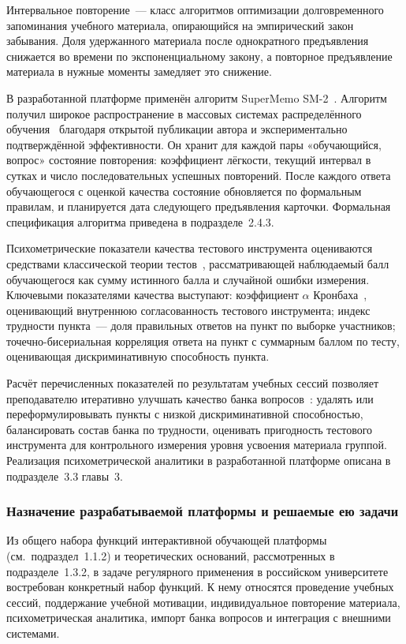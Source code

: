 Интервальное повторение~--- класс алгоритмов оптимизации
долговременного запоминания учебного материала, опирающийся
на эмпирический закон забывания. Доля удержанного материала после
однократного предъявления снижается во времени по экспоненциальному
закону, а повторное предъявление материала в нужные моменты
замедляет это снижение.

В разработанной платформе применён алгоритм SuperMemo
SM-2~\cite{wozniak1990}. Алгоритм получил широкое распространение
в массовых системах распределённого обучения~\cite{alyshova2022}
благодаря открытой публикации автора и экспериментально
подтверждённой эффективности. Он хранит для каждой пары
«обучающийся, вопрос» состояние повторения: коэффициент лёгкости,
текущий интервал в сутках и число последовательных успешных
повторений. После каждого ответа обучающегося с оценкой качества
состояние обновляется по формальным правилам, и планируется дата
следующего предъявления карточки. Формальная спецификация алгоритма
приведена в подразделе~2.4.3.

Психометрические показатели качества тестового инструмента
оцениваются средствами классической теории
тестов~\cite{crocker_algina}, рассматривающей наблюдаемый балл
обучающегося как сумму истинного балла и случайной ошибки
измерения. Ключевыми показателями качества выступают: коэффициент
$\alpha$ Кронбаха~\cite{cronbach1951}, оценивающий внутреннюю
согласованность тестового инструмента; индекс трудности пункта~---
доля правильных ответов на пункт по выборке участников;
точечно-бисериальная корреляция ответа на пункт с суммарным
баллом по тесту, оценивающая дискриминативную способность пункта.

Расчёт перечисленных показателей по результатам учебных сессий
позволяет преподавателю итеративно улучшать качество банка
вопросов~\cite{peryazeva2019}: удалять или переформулировывать
пункты с низкой дискриминативной способностью, балансировать
состав банка по трудности, оценивать пригодность тестового
инструмента для контрольного измерения уровня усвоения материала
группой. Реализация психометрической аналитики в разработанной
платформе описана в подразделе~3.3 главы~3.

\subsubsection{Назначение разрабатываемой платформы и решаемые
ею задачи}

Из общего набора функций интерактивной обучающей платформы
(см.~подраздел~1.1.2) и теоретических оснований, рассмотренных
в подразделе~1.3.2, в задаче регулярного применения в российском
университете востребован конкретный набор функций.
К нему относятся проведение учебных сессий, поддержание учебной
мотивации, индивидуальное повторение материала, психометрическая
аналитика, импорт банка вопросов и интеграция с внешними системами.

